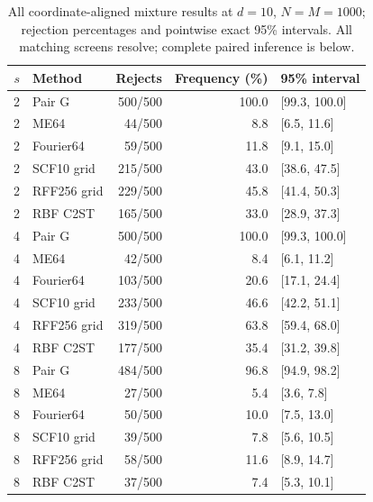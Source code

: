 \begin{table}[t]\centering\scriptsize
\caption{All coordinate-aligned mixture results at $d=10$, $N=M=1000$; rejection percentages and pointwise exact 95\% intervals. All matching screens resolve; complete paired inference is below.}
\label{tab:axis-power-d10}
{\setlength{\tabcolsep}{8pt}\renewcommand{\arraystretch}{1.2}
\begin{tabular}{rlrrl}
\toprule
$s$ & Method & Rejects & Frequency (\%) & 95\% interval\\
\midrule
2 & Pair G & 500/500 & 100.0 & [99.3, 100.0]\\
2 & ME64 & 44/500 & 8.8 & [6.5, 11.6]\\
2 & Fourier64 & 59/500 & 11.8 & [9.1, 15.0]\\
2 & SCF10 grid & 215/500 & 43.0 & [38.6, 47.5]\\
2 & RFF256 grid & 229/500 & 45.8 & [41.4, 50.3]\\
2 & RBF C2ST & 165/500 & 33.0 & [28.9, 37.3]\\
4 & Pair G & 500/500 & 100.0 & [99.3, 100.0]\\
4 & ME64 & 42/500 & 8.4 & [6.1, 11.2]\\
4 & Fourier64 & 103/500 & 20.6 & [17.1, 24.4]\\
4 & SCF10 grid & 233/500 & 46.6 & [42.2, 51.1]\\
4 & RFF256 grid & 319/500 & 63.8 & [59.4, 68.0]\\
4 & RBF C2ST & 177/500 & 35.4 & [31.2, 39.8]\\
8 & Pair G & 484/500 & 96.8 & [94.9, 98.2]\\
8 & ME64 & 27/500 & 5.4 & [3.6, 7.8]\\
8 & Fourier64 & 50/500 & 10.0 & [7.5, 13.0]\\
8 & SCF10 grid & 39/500 & 7.8 & [5.6, 10.5]\\
8 & RFF256 grid & 58/500 & 11.6 & [8.9, 14.7]\\
8 & RBF C2ST & 37/500 & 7.4 & [5.3, 10.1]\\
\bottomrule
\end{tabular}}
\end{table}

